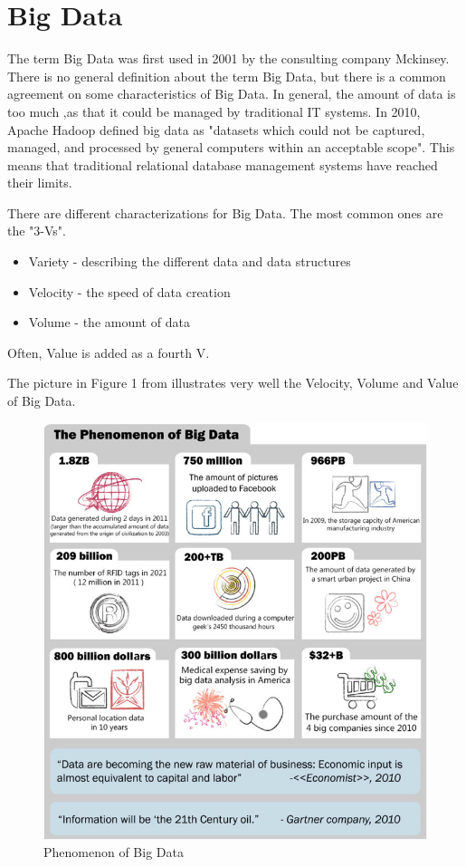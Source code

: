 \documentclass{acm_proc_article-sp}
\begin{document}
\section{Big Data}

The term Big Data was first used in 2001 by the consulting company Mckinsey\cite{DBLP:series/sbcs/ChenMZL14}. There is no general definition about the term Big Data, but there is a common agreement on some characteristics of Big Data. In general, the amount of data is too much ,as that it could be managed by traditional IT systems.
In 2010, Apache Hadoop defined big data as "datasets which could not be
captured, managed, and processed by general computers within an acceptable
scope"\cite{DBLP:series/sbcs/ChenMZL14}. This means that traditional relational database management systems have reached their limits.

There are different characterizations for Big Data. The most common ones are the "3-Vs"\cite{bigdata-challenges}.
\begin{itemize}
	\item Variety - describing the different data and data structures
	\item Velocity - the speed of data creation
	\item Volume - the amount of data
\end{itemize}
Often, Value is added as a fourth V.

The picture in Figure 1 from\cite{DBLP:series/sbcs/ChenMZL14} illustrates very well the Velocity, Volume and Value of Big Data.

\begin{figure}[hbtp]
	\centering
	\includegraphics[scale=0.45]{big_data.png}
	\caption{Phenomenon of Big Data\cite{DBLP:series/sbcs/ChenMZL14}}
\end{figure}
\end{document}
